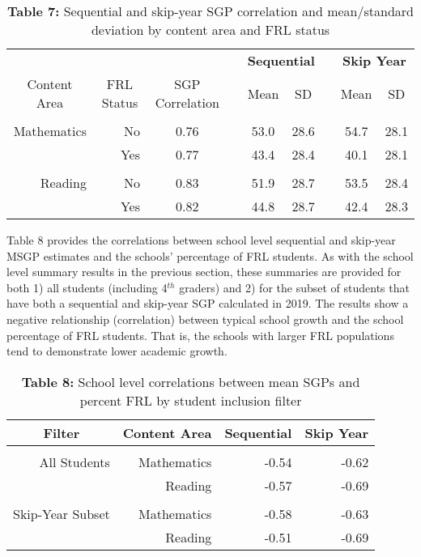 \documentclass[12pt]{article}
\begin{document}
\begin{table}[H]
\caption*{\textbf{Table 7:} Sequential and skip-year SGP correlation and mean/standard deviation by content area and FRL status\label{table7}} 
\begin{center}
\begin{tabular}{rrccccccc}
\hline\hline
\multicolumn{3}{c}{\bfseries }&\multicolumn{1}{c}{\bfseries }&\multicolumn{2}{c}{\bfseries Sequential}&\multicolumn{1}{c}{\bfseries }&\multicolumn{2}{c}{\bfseries Skip Year}\tabularnewline
\cline{5-6} \cline{8-9}
\multicolumn{1}{c}{Content Area}&\multicolumn{1}{c}{FRL Status}&\multicolumn{1}{c}{SGP Correlation}&\multicolumn{1}{c}{}&\multicolumn{1}{c}{Mean}&\multicolumn{1}{c}{SD}&\multicolumn{1}{c}{}&\multicolumn{1}{c}{Mean}&\multicolumn{1}{c}{SD}\tabularnewline
\hline
&&&&&&&&\tabularnewline
Mathematics&No&0.76&&53.0&28.6&&54.7&28.1\tabularnewline
&Yes&0.77&&43.4&28.4&&40.1&28.1\tabularnewline
\hline
&&&&&&&&\tabularnewline
Reading&No&0.83&&51.9&28.7&&53.5&28.4\tabularnewline
&Yes&0.82&&44.8&28.7&&42.4&28.3\tabularnewline
\hline
\end{tabular}\end{center}
\end{table}

Table 8 provides the correlations between school level sequential and
skip-year MSGP estimates and the schools' percentage of FRL students. As
with the school level summary results in the previous section, these
summaries are provided for both 1) all students (including 4\(^{th}\)
graders) and 2) for the subset of students that have both a sequential
and skip-year SGP calculated in 2019. The results show a negative
relationship (correlation) between typical school growth and the school
percentage of FRL students. That is, the schools with larger FRL
populations tend to demonstrate lower academic growth.

\begin{table}[H]
\caption*{\textbf{Table 8:} School level correlations between mean SGPs and percent FRL by student inclusion filter\label{table8}} 
\begin{center}
\begin{tabular}{rrrr}
\hline\hline
\multicolumn{1}{c}{Filter}&\multicolumn{1}{c}{Content Area}&\multicolumn{1}{c}{Sequential}&\multicolumn{1}{c}{Skip Year}\tabularnewline
\hline
&&&\tabularnewline
All Students&Mathematics&-0.54&-0.62\tabularnewline
&Reading&-0.57&-0.69\tabularnewline
\hline
&&&\tabularnewline
Skip-Year Subset&Mathematics&-0.58&-0.63\tabularnewline
&Reading&-0.51&-0.69\tabularnewline
\hline
\end{tabular}\end{center}
\end{table}
\end{document}
